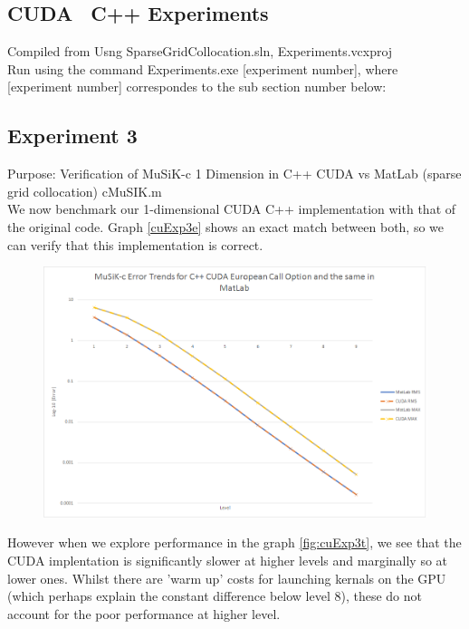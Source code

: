 \documentclass[a4paper]{amsart}
\begin{document}
\subsection{CUDA \ C++ Experiments}

Compiled from Usng SparseGridCollocation.sln, Experiments.vcxproj \\
Run using the command Experiments.exe [experiment number], 
where [experiment number] correspondes to the sub section number below:


\subsection{Experiment 3}\label{cuExp3}

Purpose: Verification of MuSiK-c 1 Dimension in C++ CUDA vs MatLab (sparse grid collocation) cMuSIK.m\\

We now benchmark our 1-dimensional CUDA C++ implementation with that of the original code. Graph \ref{cuExp3e} shows an exact match between both, so we can verify that this implementation is correct.

\begin{figure}[h]
\centering
\includegraphics[scale=0.3]{cuExp3-errors.png}
\caption {}
\label {fig:cuExp3e}
\end{figure}

However when we explore performance in the graph \ref{fig:cuExp3t}, we see that the CUDA implentation is significantly slower at higher levels and marginally so at lower ones. Whilst there are 'warm up' costs for launching kernals on the GPU (which perhaps explain the constant difference below level 8), these do not account for the poor performance at higher level.
\end{document}
